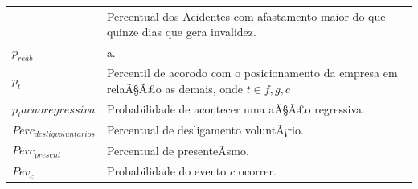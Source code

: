 \documentclass[]{article}
\begin{document}
\begin{longtable}[]{@{}ll@{}}
\begin{minipage}[t]{0.07\columnwidth}
\end{minipage} & \begin{minipage}[t]{0.87\columnwidth}\raggedright\strut
Percentual dos Acidentes com afastamento maior do que quinze dias que
gera invalidez.\strut
\end{minipage}\tabularnewline
\begin{minipage}[t]{0.07\columnwidth}\raggedright\strut
\(p_{reab}\)\strut
\end{minipage} & \begin{minipage}[t]{0.87\columnwidth}\raggedright\strut
a.\strut
\end{minipage}\tabularnewline
\begin{minipage}[t]{0.07\columnwidth}\raggedright\strut
\(p_{t}\)\strut
\end{minipage} & \begin{minipage}[t]{0.87\columnwidth}\raggedright\strut
Percentil de acorodo com o posicionamento da empresa em relaÃ§Ã£o as
demais, onde \(t \in {f,g,c}\)\strut
\end{minipage}\tabularnewline
\begin{minipage}[t]{0.07\columnwidth}\raggedright\strut
\(p_iacaoregressiva\)\strut
\end{minipage} & \begin{minipage}[t]{0.87\columnwidth}\raggedright\strut
Probabilidade de acontecer uma aÃ§Ã£o regressiva.\strut
\end{minipage}\tabularnewline
\begin{minipage}[t]{0.07\columnwidth}\raggedright\strut
\(Perc_{desligvoluntarios}\)\strut
\end{minipage} & \begin{minipage}[t]{0.87\columnwidth}\raggedright\strut
Percentual de desligamento voluntÃ¡rio.\strut
\end{minipage}\tabularnewline
\begin{minipage}[t]{0.07\columnwidth}\raggedright\strut
\(Perc_{present}\)\strut
\end{minipage} & \begin{minipage}[t]{0.87\columnwidth}\raggedright\strut
Percentual de presenteÃ­smo.\strut
\end{minipage}\tabularnewline
\begin{minipage}[t]{0.07\columnwidth}\raggedright\strut
\(Pev_{c}\)\strut
\end{minipage} & \begin{minipage}[t]{0.87\columnwidth}\raggedright\strut
Probabilidade do evento \(c\) ocorrer.\strut
\end{minipage}\tabularnewline

\end{longtable}
\end{document}
